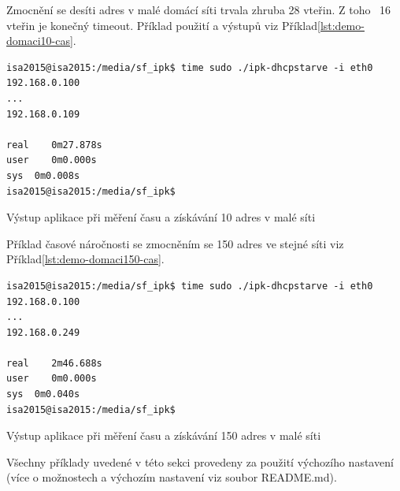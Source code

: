 \documentclass[a4paper,11pt]{article}
\renewcommand\listingscaption{Příklad}
\begin{document}
Zmocnění se desíti adres v malé domácí síti trvala zhruba 28 vteřin. Z toho ~16 vteřin je konečný timeout. Příklad použití a výstupů viz \listingscaption\space\ref{lst:demo-domaci10-cas}.

\begin{listing}[H]
	\begin{verbatim}
isa2015@isa2015:/media/sf_ipk$ time sudo ./ipk-dhcpstarve -i eth0
192.168.0.100
...
192.168.0.109

real	0m27.878s
user	0m0.000s
sys	 0m0.008s
isa2015@isa2015:/media/sf_ipk$
	\end{verbatim}
	\centering
	\caption[Rychlost získání 10 adres]{Výstup aplikace při měření času a získávání 10 adres v malé síti}
	\label{lst:demo-domaci10-cas}
\end{listing}

Příklad časové náročnosti se zmocněním se 150 adres ve stejné síti viz \listingscaption\space\ref{lst:demo-domaci150-cas}.

\begin{listing}[H]
	\begin{verbatim}
isa2015@isa2015:/media/sf_ipk$ time sudo ./ipk-dhcpstarve -i eth0
192.168.0.100
...
192.168.0.249

real	2m46.688s
user	0m0.000s
sys	 0m0.040s
isa2015@isa2015:/media/sf_ipk$ 
	\end{verbatim}
	\centering
	\caption[Rychlost získání 150 adres]{Výstup aplikace při měření času a získávání 150 adres v malé síti}
	\label{lst:demo-domaci150-cas}
\end{listing}

Všechny příklady uvedené v této sekci provedeny za použití výchozího nastavení (více o možnostech a výchozím nastavení viz soubor \textsf{README.md}).
\end{document}
